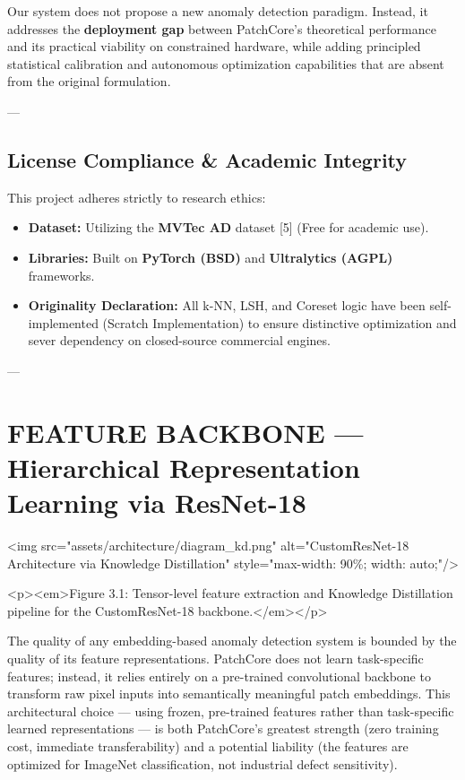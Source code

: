 \documentclass[12pt,a4paper,oneside]{report}
\begin{document}
Our system does not propose a new anomaly detection paradigm. Instead, it addresses the \textbf{deployment gap} between PatchCore's theoretical performance and its practical viability on constrained hardware, while adding principled statistical calibration and autonomous optimization capabilities that are absent from the original formulation.

---

\section{License Compliance & Academic Integrity}

This project adheres strictly to research ethics:
\begin{itemize}
  \item \textbf{Dataset:} Utilizing the \textbf{MVTec AD} dataset [5] (Free for academic use).
  \item \textbf{Libraries:} Built on \textbf{PyTorch (BSD)} and \textbf{Ultralytics (AGPL)} frameworks.
  \item \textbf{Originality Declaration:} All k-NN, LSH, and Coreset logic have been self-implemented (Scratch Implementation) to ensure distinctive optimization and sever dependency on closed-source commercial engines.
\end{itemize}
---

\chapter{FEATURE BACKBONE --- Hierarchical Representation Learning via ResNet-18}




  <img src="assets/architecture/diagram_kd.png" alt="CustomResNet-18 Architecture via Knowledge Distillation" style="max-width: 90\%; width: auto;"/>
  
  <p><em>Figure 3.1: Tensor-level feature extraction and Knowledge Distillation pipeline for the CustomResNet-18 backbone.</em></p>


The quality of any embedding-based anomaly detection system is bounded by the quality of its feature representations. PatchCore does not learn task-specific features; instead, it relies entirely on a pre-trained convolutional backbone to transform raw pixel inputs into semantically meaningful patch embeddings. This architectural choice --- using frozen, pre-trained features rather than task-specific learned representations --- is both PatchCore's greatest strength (zero training cost, immediate transferability) and a potential liability (the features are optimized for ImageNet classification, not industrial defect sensitivity).
\end{document}
